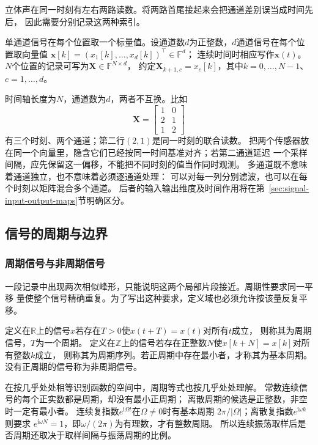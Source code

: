 立体声在同一时刻有左右两路读数。将两路首尾接起来会把通道差别误当成时间先后，
因此需要分别记录这两种索引。
\begin{definition}[标量信号与向量值信号]
  \label{def:signal-multichannel}
  单通道信号在每个位置取一个标量值。设通道数$d$为正整数，$d$通道信号在每个位置取向量值
  $\bm x[k]=(x_1[k],\ldots,x_d[k])^\top\in\mathbb F^d$；
  连续时间时相应写作$\bm x(t)$。
  $N$个位置的记录可写为$\bm X\in\mathbb F^{N\times d}$，
  约定$\bm X_{k+1,c}=x_c[k]$，其中$k=0,\ldots,N-1$、$c=1,\ldots,d$。
\end{definition}

时间轴长度为$N$，通道数为$d$，两者不互换。比如
\begin{equation}
  \bm X=
  \begin{bmatrix}1&0\\2&1\\1&2\end{bmatrix}
  \label{eq:signal-multichannel-record}
\end{equation}
有三个时刻、两个通道；第二行$(2,1)$是同一时刻的联合读数。
把两个传感器放在同一个向量里，隐含它们已经按同一时间基准对齐；若第二通道延迟
一个采样间隔，应先保留这一偏移，不能把不同时刻的值当作同时观测。
多通道既不意味着通道独立，也不意味着必须逐通道处理：
可以对每一列分别滤波，也可以在每个时刻以矩阵混合多个通道。
后者的输入输出维度及时间作用将在第~\ref{sec:signal-input-output-maps}节明确区分。

\subsection{信号的周期与边界}

\subsubsection{周期信号与非周期信号}

一段记录中出现两次相似峰形，只能说明这两个局部片段接近。周期性要求同一平移
量使整个信号精确重复。为了写出这种要求，定义域也必须允许按该量反复平移。
\begin{definition}[周期及基本周期]
  \label{def:signal-period}
  定义在$\mathbb R$上的信号$x$若存在$T>0$使$x(t+T)=x(t)$对所有$t$成立，
  则称其为周期信号，$T$为一个周期。
  定义在$\mathbb Z$上的信号若存在正整数$N$使$x[k+N]=x[k]$对所有整数$k$成立，
  则称其为周期序列。若正周期中存在最小者，才称其为基本周期。
  没有正周期的信号称为非周期信号。
\end{definition}

在按几乎处处相等识别函数的空间中，周期等式也按几乎处处理解。
常数连续信号的每个正实数都是周期，却没有最小正周期；
离散周期的候选是正整数，非空时一定有最小者。
连续复指数$e^{\mathrm i\Omega t}$在$\Omega\neq0$时有基本周期
$2\pi/|\Omega|$；离散复指数$e^{\mathrm i\omega k}$则要求
$e^{\mathrm i\omega N}=1$，即$\omega/(2\pi)$为有理数，才有整数周期。
所以连续振荡取样后是否周期还取决于取样间隔与振荡周期的比例。

